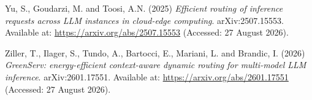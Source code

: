 \begin{list}{}{\setlength{\leftmargin}{1.5em}\setlength{\itemindent}{-1.5em}\setlength{\itemsep}{0.6em}\setlength{\parsep}{0pt}}
\item Yu, S., Goudarzi, M. and Toosi, A.N. (2025) \emph{Efficient routing of inference requests across LLM instances in cloud-edge computing}. arXiv:2507.15553. Available at: \url{https://arxiv.org/abs/2507.15553} (Accessed: 27 August 2026).

\item Ziller, T., Ilager, S., Tundo, A., Bartocci, E., Mariani, L. and Brandic, I. (2026) \emph{GreenServ: energy-efficient context-aware dynamic routing for multi-model LLM inference}. arXiv:2601.17551. Available at: \url{https://arxiv.org/abs/2601.17551} (Accessed: 27 August 2026).

\end{list}
